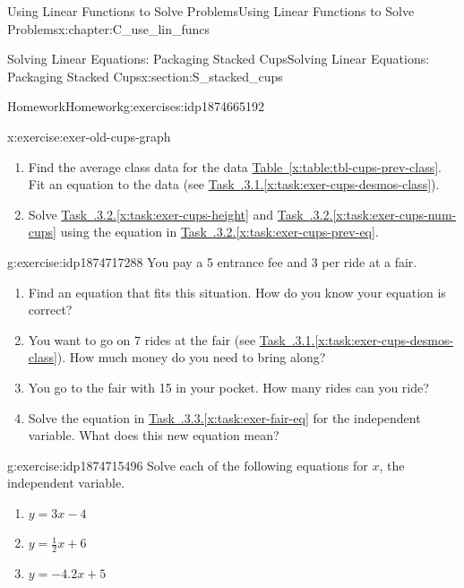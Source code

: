 \documentclass[oneside,10pt,]{book}
\newcommand{\xreffont}{\relax}
\numberwithin{equation}{chapter}
\begin{document}
\begin{chapterptx}{Using Linear Functions to Solve Problems}{}{Using Linear Functions to Solve Problems}{}{}{x:chapter:C_use_lin_funcs}
\begin{sectionptx}{Solving Linear Equations: Packaging Stacked Cups}{}{Solving Linear Equations: Packaging Stacked Cups}{}{}{x:section:S_stacked_cups}
\begin{exercises-subsection}{Homework}{}{Homework}{}{}{g:exercises:idp1874665192}
\begin{divisionexercise}{2}{}{}{x:exercise:exer-old-cups-graph}
\begin{enumerate}[font=\bfseries,label=(\alph*),ref=\alph*]
\item\label{x:task:exer-cups-prev-eq}Find the average class data for the data \hyperref[x:table:tbl-cups-prev-class]{Table~{\xreffont\ref{x:table:tbl-cups-prev-class}}}. Fit an equation to the data (see \hyperref[x:task:exer-cups-desmos-class]{Task~{\xreffont 3.2.3.1}.{\xreffont\ref{x:task:exer-cups-desmos-class}}}).%
\item{}Solve \hyperref[x:task:exer-cups-height]{Task~{\xreffont 3.2.3.2}.{\xreffont\ref{x:task:exer-cups-height}}} and \hyperref[x:task:exer-cups-num-cups]{Task~{\xreffont 3.2.3.2}.{\xreffont\ref{x:task:exer-cups-num-cups}}} using the equation in \hyperref[x:task:exer-cups-prev-eq]{Task~{\xreffont 3.2.3.2}.{\xreffont\ref{x:task:exer-cups-prev-eq}}}.%
\end{enumerate}
\end{divisionexercise}%
\begin{divisionexercise}{3}{}{}{g:exercise:idp1874717288}%
You pay a \textdollar{}5 entrance fee and \textdollar{}3 per ride at a fair.%
\begin{enumerate}[font=\bfseries,label=(\alph*),ref=\alph*]
\item\label{x:task:exer-fair-eq}Find an equation that fits this situation. How do you know your equation is correct?%
\item{}You want to go on 7 rides at the fair (see \hyperref[x:task:exer-cups-desmos-class]{Task~{\xreffont 3.2.3.1}.{\xreffont\ref{x:task:exer-cups-desmos-class}}}). How much money do you need to bring along?%
\item{}You go to the fair with \textdollar{}15 in your pocket. How many rides can you ride?%
\item{}Solve the equation in \hyperref[x:task:exer-fair-eq]{Task~{\xreffont 3.2.3.3}.{\xreffont\ref{x:task:exer-fair-eq}}} for the independent variable. What does this new equation mean?%
\end{enumerate}
\end{divisionexercise}%
\begin{divisionexercise}{4}{}{}{g:exercise:idp1874715496}%
Solve each of the following equations for \(x\), the independent variable.%
\begin{enumerate}[font=\bfseries,label=(\alph*),ref=\alph*]
\item{}\(y = 3x - 4\)%
\item{}\(y = \frac{1}{2}x + 6\)%
\item{}\(y = -4.2x + 5\)%
\end{enumerate}
\end{divisionexercise}%

\end{exercises-subsection}
\end{sectionptx}
\end{chapterptx}
\end{document}
